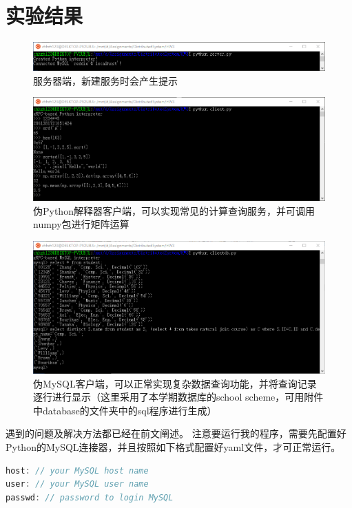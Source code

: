 \documentclass[logo,reportComp]{thesis}
\begin{document}
\section{实验结果}
\begin{figure}[H]
\centering
\includegraphics[width=\linewidth]{fig/server.png}
\caption{服务器端，新建服务时会产生提示}
\end{figure}
\begin{figure}[H]
\centering
\includegraphics[width=\linewidth]{fig/client.png}
\caption{伪Python解释器客户端，可以实现常见的计算查询服务，并可调用numpy包进行矩阵运算}
\end{figure}
\begin{figure}[H]
\centering
\includegraphics[width=\linewidth]{fig/clientdb.png}
\caption{伪MySQL客户端，可以正常实现复杂数据查询功能，并将查询记录逐行进行显示（这里采用了本学期数据库的school scheme，可用附件中database的文件夹中的sql程序进行生成）}
\end{figure}

遇到的问题及解决方法都已经在前文阐述。
注意要运行我的程序，需要先配置好Python的MySQL连接器，并且按照如下格式配置好yaml文件，才可正常运行。
\begin{lstlisting}[language=c++]
host: // your MySQL host name
user: // your MySQL user name
passwd: // password to login MySQL
\end{lstlisting}

\end{document}
